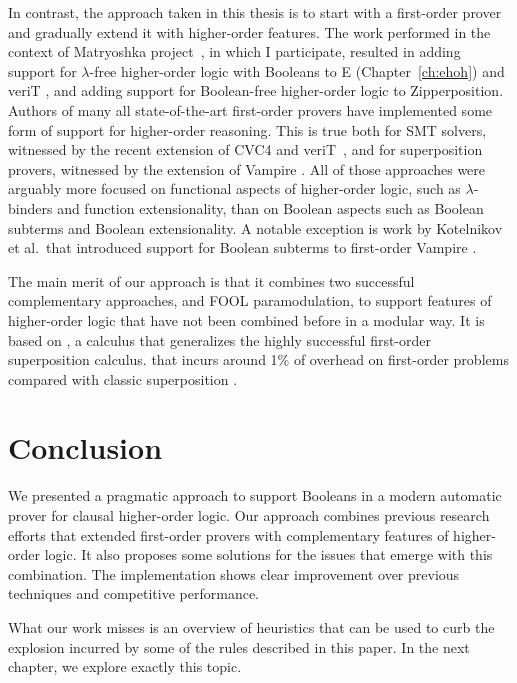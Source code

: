 In contrast, the approach taken in this thesis is to start with a first-order prover and gradually extend it
with higher-order features. The work performed in the context of Matryoshka project~\cite{matryoshka}, 
in which I participate, resulted in adding support for
$\lambda$-free higher-order logic with Booleans to E (Chapter~\ref{ch:ehoh})
and veriT \cite{cbetal-11-cvc4}, and adding support for Boolean-free higher-order
logic to Zipperposition. Authors of many all state-of-the-art
first-order provers have implemented some form of support for higher-order reasoning. This
is true both for SMT solvers, witnessed by the recent extension of CVC4 and veriT~\cite{cbetal-11-cvc4},
 and for superposition provers, witnessed
by the extension of Vampire \cite{br-19-restricted-unif}. All of those approaches were
arguably more focused on functional aspects of higher-order logic, such as
$\lambda$-binders and function extensionality, than on Boolean aspects such as
Boolean subterms and Boolean extensionality. A notable exception is work by
Kotelnikov et al.\ that introduced support for Boolean subterms to first-order
Vampire \cite{kotelnikov-15-fool,kotelnikov-16-fool}.

The main merit of our approach is that it combines two successful complementary
approaches, \lsup{} and FOOL paramodulation, to support features of higher-order logic that have not been combined
before in a modular way. It is based on \lsup{}, a calculus that generalizes the highly successful first-order superposition calculus.
that incurs around 1\% of overhead on first-order problems compared with classic
superposition \cite{bbtvw-21-sup-lam}.

\section{Conclusion} 
\label{sect:bool:conclusion}

We presented a pragmatic approach to support Booleans in a modern automatic prover
for clausal higher-order logic. Our approach combines
previous research efforts that extended first-order provers with complementary
features of higher-order logic. It also proposes some solutions for the issues that
emerge with this combination. The implementation shows clear improvement over previous
techniques and competitive performance.

What our work misses is an overview of heuristics that can be used to curb the
explosion incurred by some of the rules described in this paper. In the next chapter,
we explore exactly this topic.



